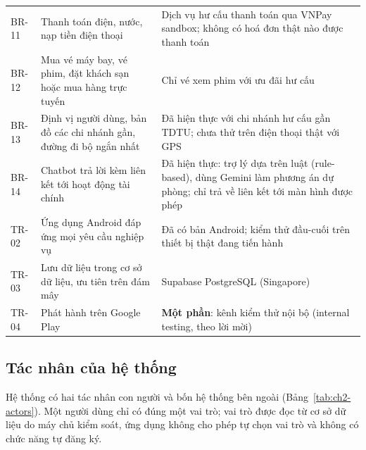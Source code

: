 {\begin{longtable}{>{\raggedright\arraybackslash}p{}>{\raggedright\arraybackslash}p{}>{\raggedright\arraybackslash}p{}}
BR-11 & Thanh toán điện, nước, nạp tiền điện thoại & Dịch vụ hư cấu thanh toán qua VNPay sandbox; không có hoá đơn thật nào được thanh toán \\
BR-12 & Mua vé máy bay, vé phim, đặt khách sạn hoặc mua hàng trực tuyến & Chỉ vé xem phim với ưu đãi hư cấu \\
BR-13 & Định vị người dùng, bản đồ các chi nhánh gần, đường đi bộ ngắn nhất & Đã hiện thực với chi nhánh hư cấu gần TDTU; chưa thử trên điện thoại thật với GPS \\
BR-14 & Chatbot trả lời kèm liên kết tới hoạt động tài chính & Đã hiện thực: trợ lý dựa trên luật (rule-based), dùng Gemini làm phương án dự phòng; chỉ trả về liên kết tới màn hình được phép
\\
TR-02 & Ứng dụng Android đáp ứng mọi yêu cầu nghiệp vụ & Đã có bản Android; kiểm thử đầu-cuối trên thiết bị thật đang tiến hành \\
TR-03 & Lưu dữ liệu trong cơ sở dữ liệu, ưu tiên trên đám mây & Supabase PostgreSQL (Singapore) \\
TR-04 & Phát hành trên Google Play & \textbf{Một phần}: kênh kiểm thử nội bộ (internal testing, theo lời mời) \\
\end{longtable}
}

\subsection{Tác nhân của hệ thống}
\label{sec:ch2-actors}

Hệ thống có hai tác nhân con người và bốn hệ thống bên ngoài (Bảng~\ref{tab:ch2-actors}). Một người dùng chỉ có đúng một vai trò; vai trò được đọc từ cơ sở dữ liệu do máy chủ kiểm soát, ứng dụng không cho phép tự chọn vai trò và không có chức năng tự đăng ký.

